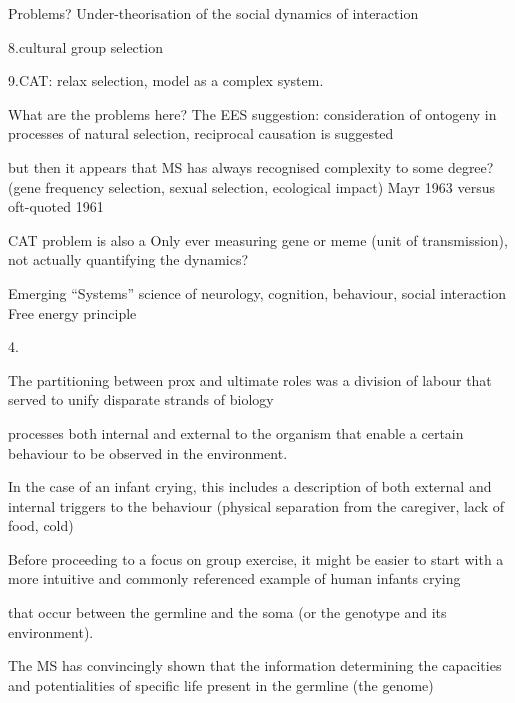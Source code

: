Problems?
Under-theorisation of the social dynamics of interaction

    8.cultural group selection

    9.CAT: relax selection, model as a complex system.

What are the problems here?
  The EES suggestion: consideration of ontogeny in processes of natural selection, reciprocal causation is suggested

  but then it appears that MS has always recognised complexity to some degree?
   (gene frequency selection, sexual selection, ecological impact)
   Mayr 1963 versus oft-quoted 1961


  CAT problem is also a Only ever measuring gene or meme (unit of transmission), not actually quantifying the dynamics?

Emerging ``Systems'' science of neurology, cognition, behaviour, social interaction
Free energy principle


4.



The partitioning between prox and ultimate roles was a division of labour that served to unify disparate strands of biology

processes both internal and external to the organism that enable a certain behaviour to be observed in the environment.

In the case of an infant crying, this includes a description of both external and internal triggers to the behaviour (physical separation from the caregiver, lack of food, cold)

Before proceeding to a focus on group exercise, it might be easier to start with a more intuitive and commonly referenced example of human infants crying

that occur between the germline and the soma (or the genotype and its environment).

The MS has convincingly shown that the information determining the capacities and potentialities of specific life present in the germline (the genome)



